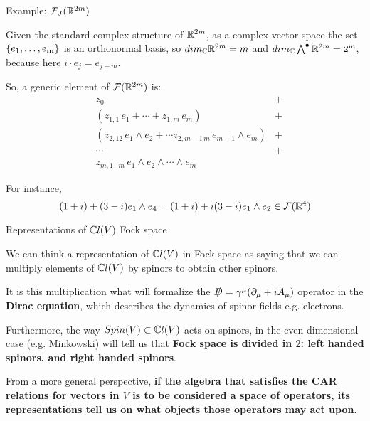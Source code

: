 \begin{frame}{Example: $\mathcal F_J(\mathbb R^{2m})$} %
    
    Given the standard complex structure of $\mathbb R^{2m}$, as a complex vector space the set $\{e_1, \dots, e_{\textbf{m}}\}$ is an orthonormal basis, so $dim_\mathbb C\mathbb R^{2m} = m$ and $dim_\mathbb C \bigwedge^\bullet \mathbb R^{2m} = 2^m$, because here $i\cdot e_j = e_{j+m}$.
    
    So, a generic element of $\mathcal F(\mathbb R^{2m})$ is: 
    \begin{align*}
        &z_0 &+ \\&(z_{1,1} \, e_1 + \cdots + z_{1,m} \, e_m) &+\\ 
        &(z_{2, 12} \, e_1\wedge e_2 + \cdots z_{2, m-1\, m} \, e_{m-1} \wedge e_{m}) &+\\ 
        &\cdots &+ \\
        &z_{m, 1\cdots m} \, e_1 \wedge e_2 \wedge \cdots \wedge e_m 
    \end{align*}
    
    For instance, \[(1+i) + (3-i)e_1 \wedge e_4 = (1+i) + i(3-i) e_1 \wedge e_2 \in \mathcal F(\mathbb R^4)\]
    
\end{frame}

\begin{frame}{Representations of $\mathbb C l(V)$ \Iff Fock space}

    We can think a representation of $\mathbb C l(V)$ in Fock space as saying that we can multiply elements of $\mathbb C l(V)$ by spinors to obtain other spinors. 
    
    It is this multiplication what will formalize the $\slashed D = \gamma^\mu ( \partial_\mu + i A_\mu)$ operator in the \textbf{Dirac equation}, which describes the dynamics of spinor fields e.g. electrons.
    
    Furthermore, the way $Spin(V) \subset \mathbb C l(V)$ acts on spinors, in the even dimensional case (e.g. Minkowski) will tell us that \textbf{Fock space is divided in $2$: left handed spinors, and right handed spinors}.
    
    From a more general perspective, \textbf{if the algebra that satisfies the CAR relations for vectors in $V$ is to be considered a space of operators, its representations tell us on what objects those operators may act upon}.
    
\end{frame}


